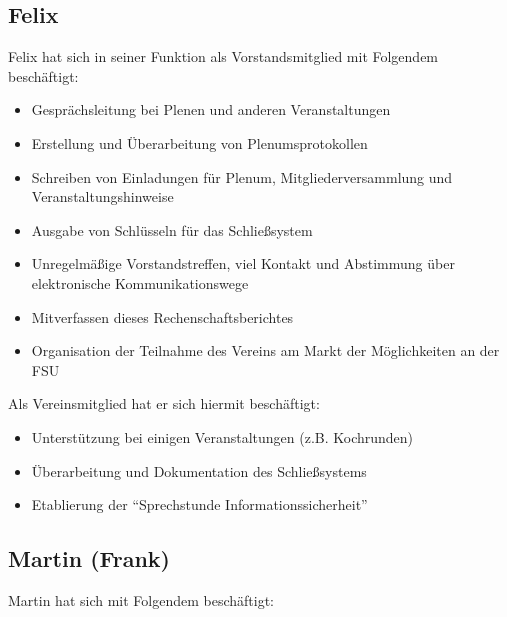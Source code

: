 \documentclass[10pt,DIV16]{scrartcl}
\begin{document}
\subsection{Felix}

Felix hat sich in seiner Funktion als Vorstandsmitglied mit Folgendem 
beschäftigt:

\begin{itemize}
    \item Gesprächsleitung bei Plenen und anderen Veranstaltungen
    \item Erstellung und Überarbeitung von Plenumsprotokollen
    \item Schreiben von Einladungen für Plenum, Mitgliederversammlung und 
        Veranstaltungshinweise
    \item Ausgabe von Schlüsseln für das Schließsystem
    \item Unregelmäßige Vorstandstreffen, viel Kontakt und Abstimmung über 
        elektronische Kommunikationswege
    \item Mitverfassen dieses Rechenschaftsberichtes
    \item Organisation der Teilnahme des Vereins am Markt der Möglichkeiten an der FSU
\end{itemize}

Als Vereinsmitglied hat er sich hiermit beschäftigt: 

\begin{itemize}
    \item Unterstützung bei einigen Veranstaltungen (z.B. Kochrunden)
    \item Überarbeitung und Dokumentation des Schließsystems
    \item Etablierung der "`Sprechstunde Informationssicherheit"'
\end{itemize}

\subsection{Martin (Frank)}

Martin hat sich mit Folgendem beschäftigt:
\end{document}
